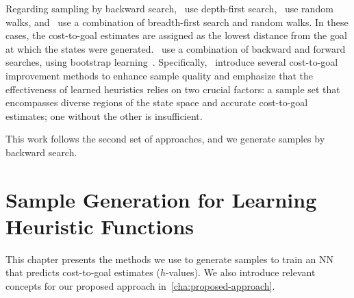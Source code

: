 \documentclass[ppgc,diss,english]{iiufrgs}
\begin{document}
Regarding sampling by backward search,~\citet{Yu.etal/2020} use depth-first search,~\citet{OToole/2022} use random walks, and~\citet{Bettker.etal/2022} use a combination of breadth-first search and random walks. In these cases, the cost-to-goal estimates are assigned as the lowest distance from the goal at which the states were generated.~\citet{Ferber.etal/2022} use a combination of backward and forward searches, using bootstrap learning~\cite{Arfaee.etal/2011}.
Specifically,~\citet{Bettker.etal/2022} introduce several cost-to-goal improvement methods to enhance sample quality and emphasize that the effectiveness of learned heuristics relies on two crucial factors: a sample set that encompasses diverse regions of the state space and accurate cost-to-goal estimates; one without the other is insufficient.

This work follows the second set of approaches, and we generate samples by backward search.




%
%
\chapter{Sample Generation for Learning Heuristic Functions}
\label{cha:sample-gen-h}
This chapter presents the methods we use to generate samples to train an NN that predicts cost-to-goal estimates ($h$-values). We also introduce relevant concepts for our proposed approach in~\cref{cha:proposed-approach}.
\end{document}
